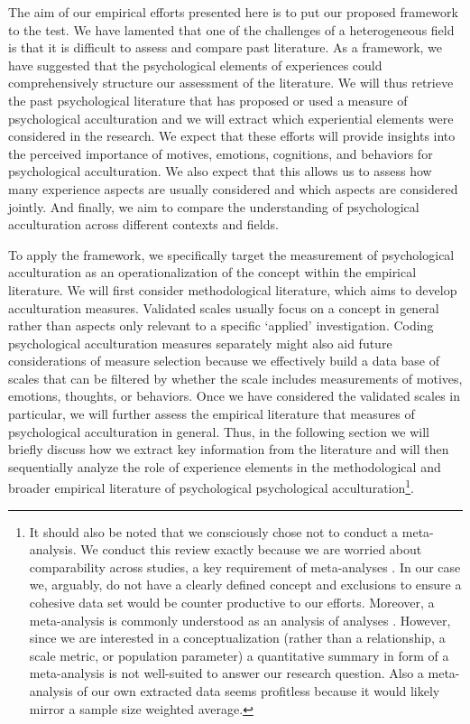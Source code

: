 \documentclass[man, 12pt, a4paper]{apa7}
\begin{document}
The aim of our empirical efforts presented here is to put our proposed framework to the test. We have lamented that one of the challenges of a heterogeneous field is that it is difficult to assess and compare past literature. As a framework, we have suggested that the psychological elements of experiences could comprehensively structure our assessment of the literature. We will thus retrieve the past psychological literature that has proposed or used a measure of psychological acculturation and we will extract which experiential elements were considered in the research. We expect that these efforts will provide insights into the perceived importance of motives, emotions, cognitions, and behaviors for psychological acculturation. We also expect that this allows us to assess how many experience aspects are usually considered and which aspects are considered jointly. And finally, we aim to compare the understanding of psychological acculturation across different contexts and fields. 

To apply the framework, we specifically target the measurement of psychological acculturation as an operationalization of the concept within the empirical literature. We will first consider methodological literature, which aims to develop acculturation measures. Validated scales usually focus on a concept in general rather than aspects only relevant to a specific `applied' investigation. Coding psychological acculturation measures separately might also aid future considerations of measure selection because we effectively build a data base of scales that can be filtered by whether the scale includes measurements of motives, emotions, thoughts, or behaviors. Once we have considered the validated scales in particular, we will further assess the empirical literature that measures of psychological acculturation in general. Thus, in the following section we will briefly discuss how we extract key information from the literature and will then sequentially analyze the role of experience elements in the methodological and broader empirical literature of psychological psychological acculturation\footnote{It should also be noted that we consciously chose not to conduct a meta-analysis. We conduct this review exactly because we are worried about comparability across studies, a key requirement of meta-analyses \citep{Pogue1998}. In our case we, arguably, do not have a clearly defined concept and exclusions to ensure a cohesive data set would be counter productive to our efforts. Moreover, a meta-analysis is commonly understood as an analysis of analyses \citep{Glass1976}. However, since we are interested in a conceptualization (rather than a relationship, a scale metric, or population parameter) a quantitative summary in form of a meta-analysis is not well-suited to answer our research question. Also a meta-analysis of our own extracted data seems profitless because it would likely mirror a sample size weighted average.}.
\end{document}
